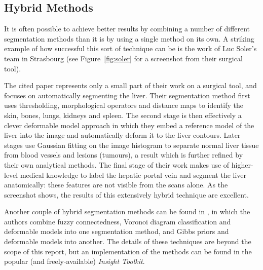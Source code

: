 

\subsection{Hybrid Methods}


It is often possible to achieve better results by combining a number of different segmentation methods than it is by using a single method on its own. A striking example of how successful this sort of technique can be is the work of Luc Soler's team in Strasbourg \cite{soler01} (see Figure~\ref{fig:soler} for a screenshot from their surgical tool).


The cited paper represents only a small part of their work on a surgical tool, and focuses on automatically segmenting the liver. Their segmentation method first uses thresholding, morphological operators and distance maps to identify the skin, bones, lungs, kidneys and spleen. The second stage is then effectively a clever deformable model approach in which they embed a reference model of the liver into the image and automatically deform it to the liver contours. Later stages use Gaussian fitting on the image histogram to separate normal liver tissue from blood vessels and lesions (tumours), a result which is further refined by their own analytical methods. The final stage of their work makes use of higher-level medical knowledge to label the hepatic portal vein and segment the liver anatomically: these features are not visible from the scans alone. As the screenshot shows, the results of this extensively hybrid technique are excellent.

Another couple of hybrid segmentation methods can be found in \cite{imielinska04}, in which the authors combine fuzzy connectedness, Voronoi diagram classification and deformable models into one segmentation method, and Gibbs priors and deformable models into another. The details of these techniques are beyond the scope of this report, but an implementation of the methods can be found in the popular (and freely-available) \emph{Insight Toolkit}.

